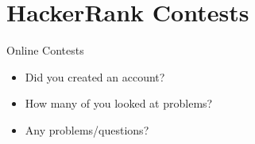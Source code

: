   \section{HackerRank Contests}

    \begin{frame}{Online Contests}
      \begin{itemize}
        \item Did you created an account?
        \pause
        \item How many of you looked at problems?
        \pause
        \item Any problems/questions?
      \end{itemize}
    \end{frame}

